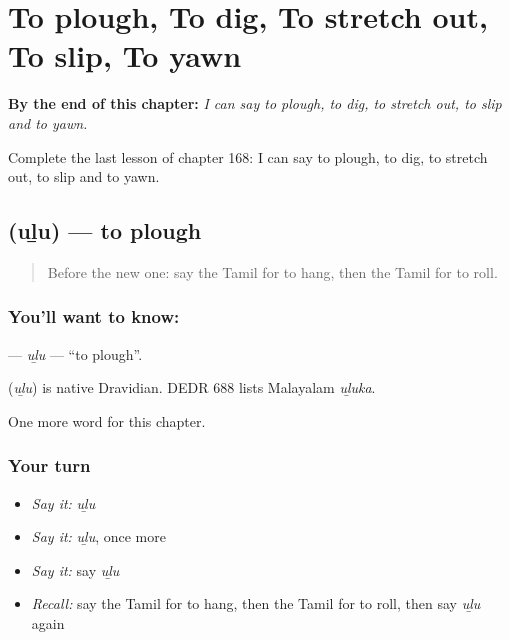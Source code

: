 
\chapter{To plough, To dig, To stretch out, To slip, To yawn}
\label{ch:ta-to-plough-to-dig-to-stretch-out-to-slip-to-yawn}

\begin{chapteropening}
\textbf{By the end of this chapter:} \emph{I can say to plough, to dig, to stretch out, to slip and to yawn.}

Complete the last lesson of chapter 168: I can say to plough, to dig, to stretch out, to slip and to yawn.
\end{chapteropening}

\section[\texorpdfstring{\ta{உழு} (uḻu)}{உழு (uḻu)}]{ (uḻu) — to plough}

\label{lesson:TA-C168-ulu}



\begin{quote}
Before the new one: say the Tamil for to hang, then the Tamil for to roll.
\end{quote}

\subsection*{You'll want to know: }
\textbf{} — \emph{uḻu} — \textquotedblleft{}to plough\textquotedblright{}.

\begin{cousinweb}
\textbf{} (\emph{uḻu}) is native Dravidian. DEDR 688 lists Malayalam \emph{uḻuka}.
\end{cousinweb}

\begin{grammarlens}[title={What you've built}]
One more word for this chapter.
\end{grammarlens}

\subsection*{Your turn}
\begin{itemize}
\raggedright
  \item \emph{Say it:} \emph{uḻu}
  \item \emph{Say it:} \emph{uḻu}, once more
  \item \emph{Say it:} say \emph{uḻu}
  \item \emph{Recall:} say the Tamil for to hang, then the Tamil for to roll, then say \emph{uḻu} again
\end{itemize}

